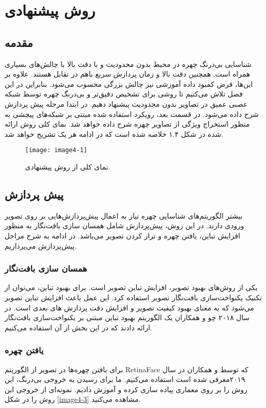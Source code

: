 \chapter{ روش پیشنهادی }
\section{مقدمه}

شناسایی بی‌درنگ چهره در محیط بدون محدودیت و با دقت بالا با چالش‌های بسیاری همراه است. همچنین دقت بالا و زمان پردازش سریع باهم در تقابل هستند. علاوه بر این‌ها، فرض ‌کمبود داده آموزشی نیز چالش بزرگی محسوب می‌شود. بنابراین در این فصل تلاش می‌کنیم تا روشی برای تشخیص دقیق‌تر و بی‌درنگ چهره توسط شبکه عصبی عمیق در تصاویر بدون محدودیت پیشنهاد دهیم. در ابتدا مرحله پیش پردازش شرح داده می‌شود. در قسمت بعد، رویكرد استفاده شده مبتنی بر شبكه‌های پیچشی به منظور استخراج ویژگی از تصاویر چهره شرح داده خواهد شد. نمای کلی روش ارائه شده در شكل ۱.۴ خلاصه شده است كه در ادامه هر یک تشریح خواهد شد.

\begin{figure}[h]
	\label{image4-1}
	\centering
  	\texttt{[image: image4-1]}
  	\caption{نمای کلی از روش پیشنهادی.}
\end{figure}

\section{پیش پردازش}
بیشتر الگوریتم‌ها‌ی شناسایی چهره نیاز به اعمال پیش‌پردازش‌هایی بر روی تصویر ورودی دارند. در این روش، پیش‌پردازش شامل همسان سازی بافت‌نگار به منظور افزایش تباین، یافتن چهره و تراز کردن تصویر می‌باشد. در ادامه به شرح مراحل پیش‌پردازش می‌پردازیم.
\subsection{همسان سازی بافت‌نگار}
یکی از روش‌های بهبود تصویر، افزایش تباین تصویر است. برای بهبود تباین، می‌توان از تکنیک یکنواخت‌سازی بافت‌نگار تصویر استفاده کرد. این عمل باعث افزایش تباین تصویر  می‌شود که به معنای بهبود کیفیت تصویر و افزایش دقت پردازش های بعدی است. در سال ۲۰۱۸ چو و همکاران \cite{s18092995} یک الگوریتم بهبود تباین مبتنی بر یکنواخت‌سازی بافت‌نگار ارائه دادند که در این بخش از آن استفاده می‌کنیم.

\subsection{یافتن چهره}
برای یافتن چهره‌ها در تصویر از الگوریتم RetinaFace که توسط  و همکاران \cite{deng2019retinaface} در سال ۲۰۱۹معرفی شده است استفاده می‌کنیم. ما برای رسیدن به خروجی بی‌درنگ، این روش را بر روی معماری  پیاده سازی کرده و آموزش دادیم. نمونه‌ای از خروجی این روش را در شکل \ref{image4-3} مشاهده می‌کنید. 

